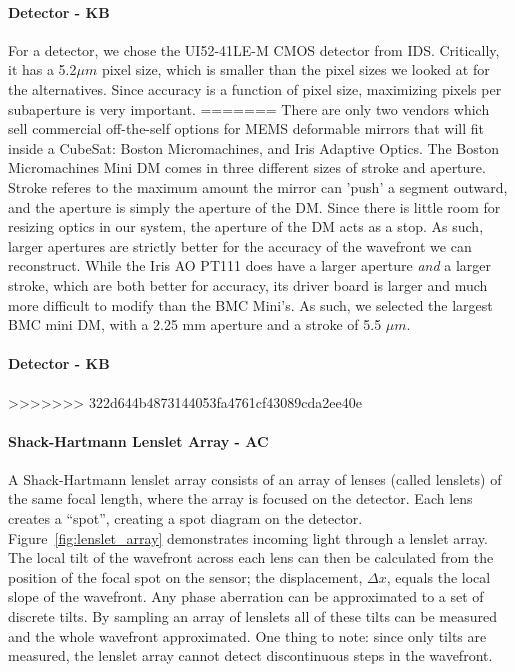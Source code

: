 \documentclass[12pt]{article}
\begin{document}
\paragraph{Detector - KB}

For a detector, we chose the UI52-41LE-M CMOS detector from IDS. Critically, it has a 5.2$\mu m$ pixel size, which is smaller than the pixel sizes we looked at for the alternatives. Since accuracy is a function of pixel size, maximizing pixels per subaperture is very
important.
=======
There are only two vendors which sell commercial off-the-self options for MEMS deformable mirrors that will fit inside a CubeSat: Boston Micromachines, and Iris Adaptive Optics. The Boston Micromachines Mini DM comes in three different sizes of stroke and aperture. Stroke referes to the maximum amount the mirror can 'push' a segment outward, and the aperture is simply the aperture of the DM. Since there is little room for resizing optics in our system, the aperture of the DM acts as a stop. As such, larger apertures are strictly better for the accuracy of the wavefront we can reconstruct. While the Iris AO PT111 does have a larger aperture \emph{and} a larger stroke, which are both better for accuracy, its driver board is larger and much more difficult to modify than the BMC Mini's. As such, we selected the largest BMC mini DM, with a 2.25 mm aperture and a stroke of 5.5 $\mu m$. 



\paragraph{Detector - KB}


>>>>>>> 322d644b4873144053fa4761cf43089cda2ee40e

\paragraph{Shack-Hartmann Lenslet Array - AC}

A Shack-Hartmann lenslet array consists of an array of lenses (called lenslets) of the same focal length, where the array is focused on the detector. Each lens creates a “spot”, creating a spot diagram on the detector. Figure~\ref{fig:lenslet_array} demonstrates incoming light through a lenslet array. The local tilt of the wavefront across each lens can then be calculated from the position of the focal spot on the sensor; the displacement, $\Delta x$, equals the local slope of the wavefront. Any phase aberration can be approximated to a set of discrete tilts. By sampling an array of lenslets all of these tilts can be measured and the whole wavefront approximated. One thing to note: since only tilts are measured, the lenslet array cannot detect discontinuous steps in the wavefront.
\end{document}
